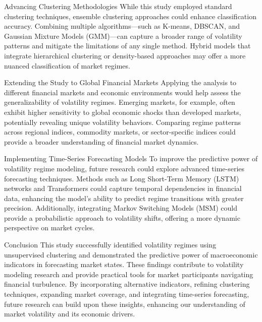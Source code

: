 Advancing Clustering Methodologies
While this study employed standard clustering techniques, ensemble clustering approaches could enhance classification accuracy. Combining multiple algorithms—such as K-means, DBSCAN, and Gaussian Mixture Models (GMM)—can capture a broader range of volatility patterns and mitigate the limitations of any single method. Hybrid models that integrate hierarchical clustering or density-based approaches may offer a more nuanced classification of market regimes.

Extending the Study to Global Financial Markets
Applying the analysis to different financial markets and economic environments would help assess the generalizability of volatility regimes. Emerging markets, for example, often exhibit higher sensitivity to global economic shocks than developed markets, potentially revealing unique volatility behaviors. Comparing regime patterns across regional indices, commodity markets, or sector-specific indices could provide a broader understanding of financial market dynamics.

Implementing Time-Series Forecasting Models
To improve the predictive power of volatility regime modeling, future research could explore advanced time-series forecasting techniques. Methods such as Long Short-Term Memory (LSTM) networks and Transformers could capture temporal dependencies in financial data, enhancing the model’s ability to predict regime transitions with greater precision. Additionally, integrating Markov Switching Models (MSM) could provide a probabilistic approach to volatility shifts, offering a more dynamic perspective on market cycles.

Conclusion
This study successfully identified volatility regimes using unsupervised clustering and demonstrated the predictive power of macroeconomic indicators in forecasting market states. These findings contribute to volatility modeling research and provide practical tools for market participants navigating financial turbulence. By incorporating alternative indicators, refining clustering techniques, expanding market coverage, and integrating time-series forecasting, future research can build upon these insights, enhancing our understanding of market volatility and its economic drivers.